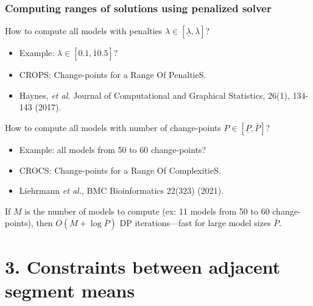 \documentclass{beamer}
\begin{document}
\begin{frame}
  \frametitle{Computing ranges of solutions using penalized solver}

  How to compute all models with penalties $\lambda\in[\underline \lambda, \overline \lambda]$?
  \begin{itemize}
  \item Example:  $\lambda\in[0.1, \overline 10.5]$?
  \item CROPS: Change-points for a Range Of PenaltieS.
  \item Haynes, \emph{et al.} Journal of Computational and Graphical Statistics, 26(1), 134-143 (2017).
  \end{itemize}
  
  How to compute all models with number of change-points $P\in[\underline P, \overline P]$?
  \begin{itemize}
  \item Example: all models from 50 to 60 change-points?
  \item CROCS: Change-points for a Range Of ComplexitieS.
  \item Liehrmann \emph{et al.}, BMC Bioinformatics 22(323) (2021).
  \end{itemize}

  If $M$ is the number of models to compute (ex: 11 models from 50 to
  60 change-points), then $O(M + \log \overline P)$ DP iterations---fast for large model sizes $\overline P$.
  
\end{frame}

\section{3. Constraints between adjacent segment means}
\end{document}

